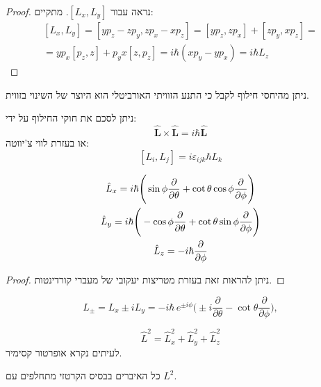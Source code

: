 \documentclass{tstextbook}
\begin{document}
\begin{proof}
נראה עבור \([L_{x},L_{y}]\). מתקיים:
$$\begin{gather}[L_{x},L_{y}]=[y p_{z}-z p_{y},z p_{x}-x p_{z}]=\left[y p_{z},z p_{x}\right]+\left[z p_{y},x p_{z}\right]=\\=y p_{x}[p_{z},z]+p_{y}x[z,p_{z}]=i\hbar(x p_{y}-y p_{x})=i\hbar L_{z} 
\end{gather}$$

\end{proof}
\begin{corollary}
ניתן מהיחסי חילוף לקבל כי התנע הזוויתי האורביטלי הוא היוצר של השינוי בזווית.

\end{corollary}
\begin{remark}
ניתן לסכם את חוקי החילוף על ידי:
$$\hat{\mathbf{L}}\times\hat{\mathbf{L}}=i\hbar\hat{\mathbf{L}}$$
או בעזרת לווי צ'יווטה:
$$[L_{i},L_{j}]=i\varepsilon_{i j k}\hbar L_{k}$$

\end{remark}
\begin{proposition}
$$\begin{gather}\hat{L}_{x}=i\hbar\Bigg(\sin\phi\frac{\partial}{\partial\theta}+\cot\theta\cos\phi\frac{\partial}{\partial\phi}\Bigg)\\\hat{L}_{y}=i\hbar\Bigg{(}-\cos\phi\frac{\partial}{\partial\theta}+\cot\theta\sin\phi\frac{\partial}{\partial\phi}\Bigg{)}\\\hat{L}_{z}=-i\hbar\frac{\partial}{\partial\phi} 
\end{gather}$$

\end{proposition}
\begin{proof}
ניתן להראות זאת בעזרת מטריצות יעקובי של מעברי קורדינטות.

\end{proof}
\begin{proposition}
$$L_{\pm}=L_{x}\pm i L_{y}=-i\hbar\,e^{\pm i\phi}\Big(\pm i\frac{\partial}{\partial\theta}-\cot\theta\frac{\partial}{\partial\phi}\Big),$$

\end{proposition}
\begin{definition}
$$\hat{L}^{2}=\hat{L}_{x}^{2}+\hat{L}_{y}^{2}+\hat{L}_{z}^{2}$$
לעיתים נקרא אופרטור קסימיר.

\end{definition}
\begin{proposition}
כל האיברים בבסיס הקרטזי מתחלפים עם \(L^{2}\).

\end{proposition}
\end{document}
